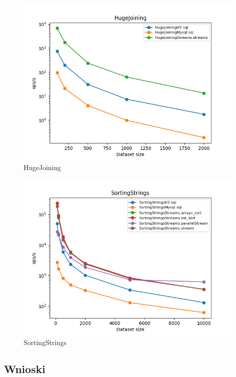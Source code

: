 \documentclass[12pt]{extarticle}
\begin{document}
\begin{figure}[H]
\centering
\includegraphics[width=15cm]{plots/HugeJoining}
\caption{HugeJoining}
\end{figure}

\begin{figure}[H]
\centering
\includegraphics[width=15cm]{plots/SortingStrings}
\caption{SortingStrings}
\end{figure}


\subsection{Wnioski}
\end{document}
